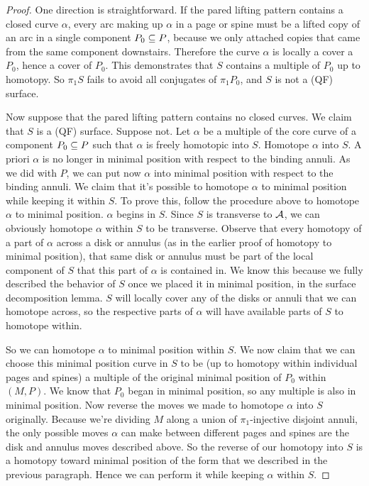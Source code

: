 \begin{proof}

One direction is straightforward. If the pared lifting pattern contains
a closed curve $\alpha$, every arc making up $\alpha$ in a page or spine must
be a lifted copy of an arc in a single component $P_0 \subseteq P$, because we only
attached copies that came from the same component downstairs. Therefore the
curve $\alpha$ is locally a cover a $P_0$, hence a cover of $P_0$. This
demonstrates that $S$ contains a multiple of $P_0$ up to homotopy. So $\pi_1S$
fails to avoid all conjugates of $\pi_1P_0$, and $S$ is not a (QF) surface.

Now suppose that the pared lifting pattern contains no closed curves. We claim
that $S$ is a (QF) surface. Suppose not. Let $\alpha$ be a multiple of the core
curve of a component $P_0 \subseteq  P$ such that $\alpha$ is freely homotopic into
$S$.  Homotope $\alpha$ into $S$. A priori $\alpha$ is no longer in minimal
position with respect to the binding annuli. As we did with $P$, we can put now
$\alpha$ into minimal position with respect to the binding annuli.  We claim
that it's possible to homotope $\alpha$ to minimal position while keeping it
within $S$.  To prove this, follow the procedure above to homotope $\alpha$ to
minimal position.  $\alpha$ begins in $S$.  Since $S$ is transverse to $\mathcal{A}$,
we can obviously homotope $\alpha$ within $S$ to be transverse.  Observe that
every homotopy of a part of $\alpha$ across a disk or annulus (as in the
earlier proof of homotopy to minimal position), that same disk or annulus must
be part of the local component of $S$ that this part of $\alpha$ is contained
in.  We know this because we fully described the behavior of $S$ once we placed
it in minimal position, in the surface decomposition lemma.  $S$ will locally
cover any of the disks or annuli that we can homotope across, so the respective
parts of $\alpha$ will have available parts of $S$ to homotope within.

So we can homotope $\alpha$ to minimal position within $S$. We now claim that
we can choose this minimal position curve in $S$ to be (up to homotopy within
individual pages and spines) a multiple of the original minimal position of
$P_0$ within $(M,P)$. We know that $P_0$ began in minimal position, so any
multiple is also in minimal position. Now reverse the moves we made to homotope
$\alpha$ into $S$ originally. Because we're dividing $M$ along a union of
$\pi_1$-injective disjoint annuli, the only possible moves $\alpha$ can make
between different pages and spines are the disk and annulus moves described
above. So the reverse of our homotopy into $S$ is a homotopy toward minimal
position of the form that we described in the previous paragraph. Hence we can
perform it while keeping $\alpha$ within $S$.


\end{proof}
